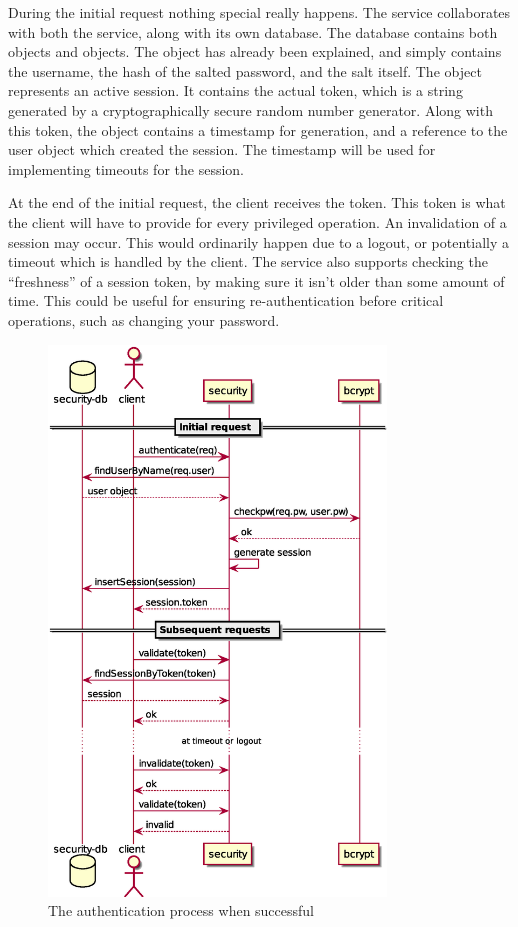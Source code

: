 During the initial request nothing special really happens. The \security
service collaborates with both the \bcrypt service, along with its own
database. The database contains both  objects and 
objects. The  object has already been explained, and simply contains
the username, the hash of the salted password, and the salt itself. The
 object represents an active session. It contains the actual
token, which is a string generated by a cryptographically secure random number
generator. Along with this token, the object contains a timestamp for
generation, and a reference to the user object which created the session. The
timestamp will be used for implementing timeouts for the session.

At the end of the initial request, the client receives the token. This token is
what the client will have to provide for every privileged operation.  An
invalidation of a session may occur. This would ordinarily happen due to a
logout, or potentially a timeout which is handled by the client. The \security
service also supports checking the ``freshness'' of a session token, by making
sure it isn't older than some amount of time. This could be useful for ensuring
re-authentication before critical operations, such as changing your password.

\begin{figure}
    \begin{center}
    \includegraphics[width=0.8\textwidth]{package_manager/auth_sequence.eps}
    \end{center}
    \caption{The authentication process when successful}
    \label{fig:auth_process}
\end{figure}

